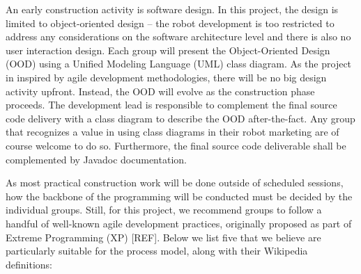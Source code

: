 \documentclass{scrreprt}
\begin{document}
An early construction activity is software design. In this project, the design is limited to object-oriented design -- the robot development is too restricted to address any considerations on the software architecture level and there is also no user interaction design. Each group will present the Object-Oriented Design (OOD) using a Unified Modeling Language (UML) class diagram. As the project in inspired by agile development methodologies, there will be no big design activity upfront. Instead, the OOD will evolve as the construction phase proceeds. The development lead is responsible to complement the final source code delivery with a class diagram to describe the OOD after-the-fact. Any group that recognizes a value in using class diagrams in their  robot marketing are of course welcome to do so. Furthermore, the final source code deliverable shall be complemented by Javadoc documentation.  

As most practical construction work will be done outside of scheduled sessions, how the backbone of the programming will be conducted must be decided by the individual groups. Still, for this project, we recommend groups to follow a handful of well-known agile development practices, originally proposed as part of Extreme Programming (XP) [REF]. Below we list five that we believe are particularly suitable for the process model, along with their Wikipedia definitions:
\end{document}

